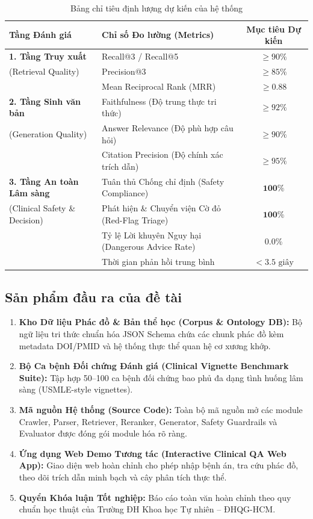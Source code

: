 \documentclass[12pt,a4paper]{article}
\begin{document}
\begin{table}[htbp]
\centering
\fontsize{11pt}{14pt}\selectfont
\caption{Bảng chỉ tiêu định lượng dự kiến của hệ thống}
\label{tab:metrics}
\begin{tabularx}{\textwidth}{|l|X|c|}
\hline
\textbf{Tầng Đánh giá} & \textbf{Chỉ số Đo lường (Metrics)} & \textbf{Mục tiêu Dự kiến} \\ \hline
\textbf{1. Tầng Truy xuất} & Recall@3 / Recall@5 & $\ge 90\%$ \\
(Retrieval Quality) & Precision@3 & $\ge 85\%$ \\
& Mean Reciprocal Rank (MRR) & $\ge 0.88$ \\ \hline
\textbf{2. Tầng Sinh văn bản} & Faithfulness (Độ trung thực tri thức) & $\ge 92\%$ \\
(Generation Quality) & Answer Relevance (Độ phù hợp câu hỏi) & $\ge 90\%$ \\
& Citation Precision (Độ chính xác trích dẫn) & $\ge 95\%$ \\ \hline
\textbf{3. Tầng An toàn Lâm sàng} & Tuân thủ Chống chỉ định (Safety Compliance) & $\mathbf{100\%}$ \\
(Clinical Safety \& Decision) & Phát hiện \& Chuyển viện Cờ đỏ (Red-Flag Triage) & $\mathbf{100\%}$ \\
& Tỷ lệ Lời khuyên Nguy hại (Dangerous Advice Rate) & $\mathbf{0.0\%}$ \\
& Thời gian phản hồi trung bình & $< 3.5\text{ giây}$ \\ \hline
\end{tabularx}
\end{table}

\subsection{Sản phẩm đầu ra của đề tài}
\begin{enumerate}[leftmargin=1.27cm, label=\arabic*.]
    \item \textbf{Kho Dữ liệu Phác đồ \& Bản thể học (Corpus \& Ontology DB):} Bộ ngữ liệu tri thức chuẩn hóa JSON Schema chứa các chunk phác đồ kèm metadata DOI/PMID và hệ thống thực thể quan hệ cơ xương khớp.
    \item \textbf{Bộ Ca bệnh Đối chứng Đánh giá (Clinical Vignette Benchmark Suite):} Tập hợp 50--100 ca bệnh đối chứng bao phủ đa dạng tình huống lâm sàng (USMLE-style vignettes).
    \item \textbf{Mã nguồn Hệ thống (Source Code):} Toàn bộ mã nguồn mở các module Crawler, Parser, Retriever, Reranker, Generator, Safety Guardrails và Evaluator được đóng gói module hóa rõ ràng.
    \item \textbf{Ứng dụng Web Demo Tương tác (Interactive Clinical QA Web App):} Giao diện web hoàn chỉnh cho phép nhập bệnh án, tra cứu phác đồ, theo dõi trích dẫn minh bạch và cây phân tích thực thể.
    \item \textbf{Quyển Khóa luận Tốt nghiệp:} Báo cáo toàn văn hoàn chỉnh theo quy chuẩn học thuật của Trường ĐH Khoa học Tự nhiên -- ĐHQG-HCM.
\end{enumerate}
\end{document}
